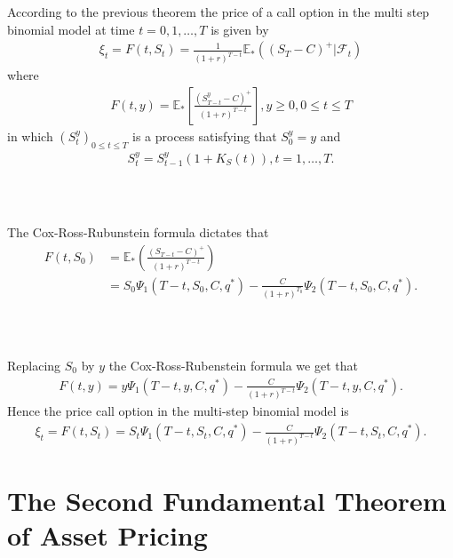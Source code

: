 \documentclass{beamer}
\numberwithin{equation}{section}
\begin{document}
\begin{frame}\frametitle{{\normalsize \secname} \\ {\large \subsecname}}
    According to the previous theorem the price of a call option in the multi step binomial model at time $t = 0,1, \ldots, T$ is given by
    \begin{align}
        \xi_t = F(t, S_t) = \frac{1}{(1+r)^{T-t}} \mathbb{E}_* \left( (S_T - C)^+ | \mathscr{F}_t \right)
    \end{align}
    where
    \begin{align}
        F(t,y) = \mathbb{E}_* \left[ \frac{(S_{T-t}^y - C)^+}{(1+r)^{T-t}} \right], y \geq 0, 0 \leq t \leq T
    \end{align}
    in which $(S_t^y)_{0 \leq t \leq T}$ is a process satisfying that $S_0^y = y$ and
    \begin{align}
        S_t^y = S_{t-1}^y(1 + K_S(t)), t = 1, \ldots, T.
    \end{align}
\end{frame}

\begin{frame}\frametitle{{\normalsize \secname} \\ {\large \subsecname}}
    The Cox-Ross-Rubunstein formula dictates that
    \begin{align}
        F(t, S_0) &= \mathbb{E}_* \left(  \frac{(S_{T-t} - C)^+}{(1+r)^{T-t}} \right)\\
        &= S_0 \Psi_1 (T-t, S_0, C, q^*) - \frac{C}{(1+r)^{T_0}} \Psi_2(T-t, S_0, C, q^*).
    \end{align}
\end{frame}

\begin{frame}\frametitle{{\normalsize \secname} \\ {\large \subsecname}}
    Replacing $S_0$ by $y$ the Cox-Ross-Rubenstein formula we get that
    \begin{align}
        F(t, y) = y \Psi_1 (T-t, y, C, q^*) - \frac{C}{(1+r)^{T-t}}\Psi_2(T-t, y, C, q^*).
    \end{align}
    Hence the price call option in the multi-step binomial model is
    \begingroup
    \small
    \begin{align}
        \xi_t = F(t, S_t) = S_t \Psi_1(T-t, S_t,C, q^*) - \frac{C}{(1+r)^{T-t}} \Psi_2(T-t, S_t, C, q^*).
    \end{align}
    \endgroup
\end{frame}

\section{The Second Fundamental Theorem of Asset Pricing}
\end{document}
